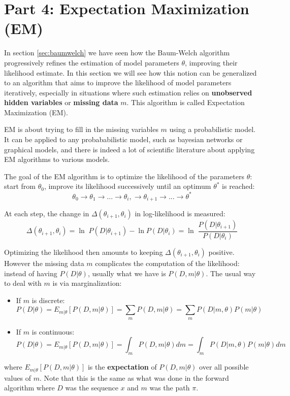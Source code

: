 \newpage
\section{Part 4: Expectation Maximization (EM)}
\label{sec:em}

In section \ref{sec:baumwelch} we have seen how the Baum-Welch algorithm progressively refines the estimation of model parameters $\theta$, improving their likelihood estimate. In this section we will see how this notion can be generalized to an algorithm that aims to improve the likelihood of model parameters iteratively, especially in situations where such estimation relies on {\bf unobserved hidden variables} or {\bf missing data} $m$.
This algorithm is called Expectation Maximization (EM).

EM is about trying to fill in the missing variables $m$ using a probabilistic model. It can be applied to any probababilistic model, such as bayesian networks   or graphical models, and there is indeed a lot of scientific literature about applying EM algorithms to various models.
 
The goal of the EM algorithm is to optimize the likelihood of the parameters $\theta$: start from $\theta_0$, improve its likelihood successively until an optimum $\theta^{*}$ is reached:
\begin{equation}
\theta_0  \rightarrow \theta_1 \rightarrow ... 
\rightarrow \theta_i, \rightarrow \theta_{i+1}
\rightarrow ... \rightarrow \theta^{*} 
\end{equation}

At each step, the change in $\Delta(\theta_{i+1}, \theta_i)$ in log-likelihood is measured:
\begin{equation}
\Delta(\theta_{i+1}, \theta_i) 
= \ln \; P(D|\theta_{i+1}) - \ln P(D|\theta_i)
= \ln \; \frac{P(D|\theta_{i+1})}{P(D|\theta_i)}
\end{equation}

Optimizing the likelihood then amounts to keeping $\Delta(\theta_{i+1}, \theta_i)$ positive. However the missing data $m$ complicates the computation of the likelihood: instead of having $P(D|\theta)$, usually what we have is $P(D,m|\theta)$. The usual way to deal with $m$ is via marginalization:
%
\begin{itemize}
\item If $m$ is discrete:
\begin{equation}
P(D|\theta) = E_{m|\theta}[P(D,m|\theta)] = \sum_m P(D,m|\theta) = 
\sum_m P(D|m,\theta) P(m|\theta)
\end{equation}
%
\item If $m$ is continuous:
\begin{equation}
P(D|\theta) = E_{m|\theta}[P(D,m|\theta)] = \int_m P(D,m|\theta) dm = 
\int_m P(D|m,\theta) P(m|\theta) dm
\end{equation}
\end{itemize}
%
where $E_{m|\theta}[P(D,m|\theta)]$ is the {\bf expectation} of $P(D,m|\theta)$ over all possible values of $m$. Note that this is the same as what was done in the forward algorithm where $D$ was the sequence $x$ and $m$ was the path $\pi$.

